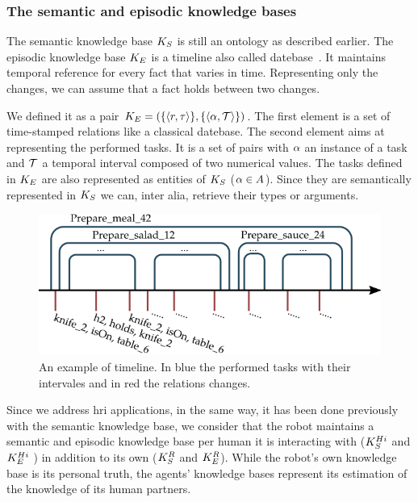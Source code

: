 \subsubsection{The semantic and episodic knowledge bases}

The semantic knowledge base $K_S$ is still an ontology as described earlier. The episodic knowledge base $K_E$ is a timeline also called datebase~\cite{allen_1983_maintaining}. It maintains temporal reference for every fact that varies in time. Representing only the changes, we can assume that a fact holds between two changes.

We defined it as a pair $K_E = ( \{ \langle r, \tau \rangle \}, \{ \langle \alpha, \mathcal{T} \rangle \} )$. The first element is a set of time-stamped relations like a classical datebase. The second element aims at representing the performed tasks. It is a set of pairs with $\alpha$ an instance of a task and $\mathcal{T}$ a temporal interval composed of two numerical values. The tasks defined in $K_E$ are also represented as entities of $K_S$ ($\alpha \in A$). Since they are semantically represented in $K_S$ we can, inter alia, retrieve their types or arguments.

\begin{figure}[h!]
\centering
\includegraphics[scale=0.55]{figures/chapter6/ke.png}
\caption{\label{fig:chap6_ke} An example of timeline. In blue the performed tasks with their intervales and in red the relations changes.}
\end{figure}

Since we address \acrshort{hri} applications, in the same way, it has been done previously with the semantic knowledge base, we consider that the robot maintains a semantic and episodic knowledge base per human it is interacting with ($K_S^{Hi}$ and $K_E^{Hi}$ ) in addition to its own ($K_S^{R}$ and $K_E^{R}$). While the robot's own knowledge base is its personal truth, the agents' knowledge bases represent its estimation of the knowledge of its human partners.

